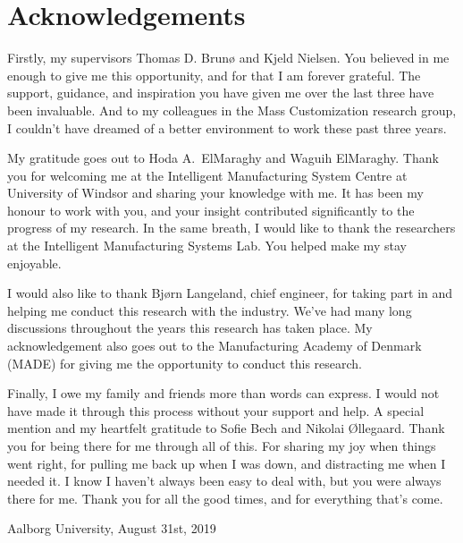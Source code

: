 \section*{Acknowledgements}\label{ack}

Firstly, my supervisors \AProf{} Thomas D. Brunø and \AProf{} Kjeld Nielsen.
You believed in me enough to give me this opportunity, and for that I am forever grateful.
The support, guidance, and inspiration you have given me over the last three have been invaluable.
And to my colleagues in the Mass Customization research group, I couldn't have dreamed of a better environment to work these past three years. 

My gratitude  goes out to \Prof{} Hoda A.\ ElMaraghy and \Prof{} Waguih ElMaraghy.
Thank you for welcoming me at the Intelligent Manufacturing System Centre at University of Windsor and sharing your knowledge with me.
It has been my honour to work with you, and your insight contributed significantly to the progress of my research.
In the same breath, I would like to thank the researchers at the Intelligent Manufacturing Systems Lab.
You helped make my stay enjoyable.

I would also like to thank Bjørn Langeland, chief engineer, for taking part in and helping me conduct this research with the industry.
We've had many long discussions throughout the years this research has taken place.
My acknowledgement also goes out to the Manufacturing Academy of Denmark (MADE) for giving me the opportunity to conduct this research.

Finally, I owe my family and friends more than words can express.
I would not have made it through this process without your support and help. 
A special mention and my heartfelt gratitude to Sofie Bech and Nikolai Øllegaard.
Thank you for being there for me through all of this.
For sharing my joy when things went right, for pulling me back up when I was down, and distracting me when I needed it.
I know I haven't always been easy to deal with, but you were always there for me.
Thank you for all the good times, and for everything that's come.
\begin{flushright}
\docAuthor%

Aalborg University, August 31st, 2019
\end{flushright}

